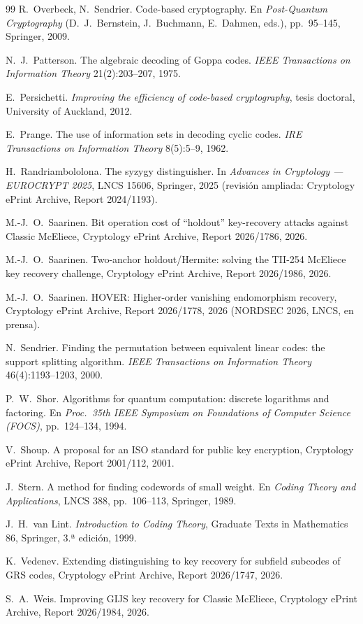 \begin{thebibliography}{99}
R.~Overbeck, N.~Sendrier. Code-based cryptography. En
\emph{Post-Quantum Cryptography} (D.~J.~Bernstein, J.~Buchmann,
E.~Dahmen, eds.), pp.~95--145, Springer, 2009.

N.~J.~Patterson. The algebraic decoding of Goppa codes. \emph{IEEE
Transactions on Information Theory} 21(2):203--207, 1975.

E.~Persichetti. \emph{Improving the efficiency of code-based
cryptography}, tesis doctoral, University of Auckland, 2012.

E.~Prange. The use of information sets in decoding cyclic codes.
\emph{IRE Transactions on Information Theory} 8(5):5--9, 1962.

H.~Randriambololona. The syzygy distinguisher. In \emph{Advances in
Cryptology --- EUROCRYPT 2025}, LNCS 15606, Springer, 2025
(revisi\'on ampliada: Cryptology ePrint Archive, Report 2024/1193).

M.-J.~O.~Saarinen. Bit operation cost of ``holdout'' key-recovery
attacks against Classic McEliece, Cryptology ePrint Archive,
Report 2026/1786, 2026.

M.-J.~O.~Saarinen. Two-anchor holdout/Hermite: solving the TII-254
McEliece key recovery challenge, Cryptology ePrint Archive,
Report 2026/1986, 2026.

M.-J.~O.~Saarinen. HOVER: Higher-order vanishing endomorphism
recovery, Cryptology ePrint Archive, Report 2026/1778, 2026
(NORDSEC 2026, LNCS, en prensa).

N.~Sendrier. Finding the permutation between equivalent linear
codes: the support splitting algorithm. \emph{IEEE Transactions on
Information Theory} 46(4):1193--1203, 2000.

P.~W.~Shor. Algorithms for quantum computation: discrete logarithms
and factoring. En \emph{Proc.\ 35th IEEE Symposium on Foundations of
Computer Science (FOCS)}, pp.~124--134, 1994.

V.~Shoup. A proposal for an ISO standard for public key encryption,
Cryptology ePrint Archive, Report 2001/112, 2001.

J.~Stern. A method for finding codewords of small weight. En
\emph{Coding Theory and Applications}, LNCS 388, pp.~106--113,
Springer, 1989.

J.~H.~van Lint. \emph{Introduction to Coding Theory}, Graduate
Texts in Mathematics 86, Springer, 3.ª edici\'on, 1999.

K.~Vedenev. Extending distinguishing to key recovery for subfield
subcodes of GRS codes, Cryptology ePrint Archive, Report 2026/1747,
2026.

S.~A.~Weis. Improving GIJS key recovery for Classic McEliece,
Cryptology ePrint Archive, Report 2026/1984, 2026.

\end{thebibliography}
